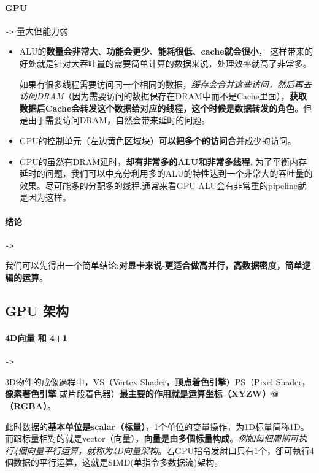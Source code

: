 \documentclass[UTF8,a4paper,12pt]{ctexbook}
\begin{document}
			\paragraph{GPU}\verb|->|
					量大但能力弱
					\begin{itemize}
						\item ALU的\textbf{数量会非常大}、\textbf{功能会更少}、\textbf{能耗很低}、\textbf{cache就会很小}，
						这样带来的好处就是针对大吞吐量的需要简单计算的数据来说，处理效率就高了非常多。
						
						如果有很多线程需要访问同一个相同的数据，\textit{缓存会合并这些访问，然后再去访问DRAM}（因为需要访问的数据保存在DRAM中而不是Cache里面），\textbf{获取数据后Cache会转发这个数据给对应的线程，这个时候是数据转发的角色}。但是由于需要访问DRAM，自然会带来延时的问题。
						
						\item GPU的控制单元（左边黄色区域块）\textbf{可以把多个的访问合并}成少的访问。
						
						\item GPU的虽然有DRAM延时，\textbf{却有非常多的ALU和非常多线程}. 为了平衡内存延时的问题，我们可以中充分利用多的ALU的特性达到一个非常大的吞吐量的效果。尽可能多的分配多的线程.通常来看GPU ALU会有非常重的pipeline就是因为这样。
					\end{itemize}
			
			\paragraph{结论}\verb|->|
			
				我们可以先得出一个简单结论:\color{blue}\textbf{对显卡来说}\color{black}-\textbf{更适合做高并行，高数据密度，简单逻辑的运算}。
	
		\newpage
		\subsection{GPU 架构}
			\paragraph{4D向量 和 4+1}\verb|->|
							
				3D物件的成像過程中，VS（Vertex Shader，\textbf{顶点着色引擎}）PS（Pixel Shader，\textbf{像素著色引擎} 或片段着色器）\textbf{最主要的作用就是运算坐标（XYZW）@（RGBA）}。
				
				此时数据的\textbf{基本单位是scalar（标量）}，1个单位的变量操作，为1D标量简称1D。 
				而跟标量相對的就是vector（向量），\textbf{向量是由多個标量构成}。\textit{例如每個周期可执行4個向量平行运算，就称为4D向量架构}。若GPU指令发射口只有1个，卻可執行4個数据的平行运算，这就是SIMD(单指令多数据流)架构。	
			
\end{document}
